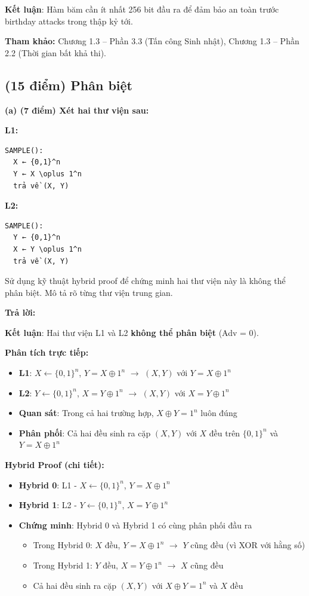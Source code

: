 \textbf{Kết luận}: Hàm băm cần ít nhất 256 bit đầu ra để đảm bảo an toàn trước birthday attacks trong thập kỷ tới.

\textbf{Tham khảo:} Chương 1.3 – Phần 3.3 (Tấn công Sinh nhật), Chương 1.3 – Phần 2.2 (Thời gian bất khả thi).

\subsection{(15 điểm) Phân biệt}

\textbf{(a) (7 điểm) Xét hai thư viện sau:}

\textbf{L1:}
\begin{verbatim}
SAMPLE():
  X ← {0,1}^n
  Y ← X \oplus 1^n
  trả về (X, Y)
\end{verbatim}

\textbf{L2:}
\begin{verbatim}
SAMPLE():
  Y ← {0,1}^n
  X ← Y \oplus 1^n
  trả về (X, Y)
\end{verbatim}

Sử dụng kỹ thuật hybrid proof để chứng minh hai thư viện này là không thể phân biệt. Mô tả rõ từng thư viện trung gian.

\begin{center}
\textbf{Trả lời:}
\end{center}

\textbf{Kết luận}: Hai thư viện L1 và L2 \textbf{không thể phân biệt} (Adv = 0).

\textbf{Phân tích trực tiếp:}
\begin{itemize}
    \item \textbf{L1}: $X \leftarrow \{0,1\}^n$, $Y = X \oplus 1^n$ $\rightarrow$ $(X, Y)$ với $Y = X \oplus 1^n$
    \item \textbf{L2}: $Y \leftarrow \{0,1\}^n$, $X = Y \oplus 1^n$ $\rightarrow$ $(X, Y)$ với $X = Y \oplus 1^n$
    \item \textbf{Quan sát}: Trong cả hai trường hợp, $X \oplus Y = 1^n$ luôn đúng
    \item \textbf{Phân phối}: Cả hai đều sinh ra cặp $(X, Y)$ với $X$ đều trên $\{0,1\}^n$ và $Y = X \oplus 1^n$
\end{itemize}

\textbf{Hybrid Proof (chi tiết):}
\begin{itemize}
    \item \textbf{Hybrid 0}: L1 - $X \leftarrow \{0,1\}^n$, $Y = X \oplus 1^n$
    \item \textbf{Hybrid 1}: L2 - $Y \leftarrow \{0,1\}^n$, $X = Y \oplus 1^n$
    \item \textbf{Chứng minh}: Hybrid 0 và Hybrid 1 có cùng phân phối đầu ra
    \begin{itemize}
        \item Trong Hybrid 0: $X$ đều, $Y = X \oplus 1^n$ $\rightarrow$ $Y$ cũng đều (vì XOR với hằng số)
        \item Trong Hybrid 1: $Y$ đều, $X = Y \oplus 1^n$ $\rightarrow$ $X$ cũng đều
        \item Cả hai đều sinh ra cặp $(X, Y)$ với $X \oplus Y = 1^n$ và $X$ đều
    \end{itemize}
\end{itemize}

